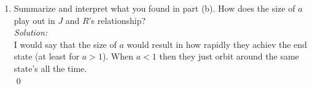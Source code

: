 \documentclass[10pt]{amsart}
\theoremstyle{nonumberplain}
\begin{document}
\begin{enumerate}[label={\bf {\arabic*}:}]
\begin{enumerate}
\begin{enumerate}
\item Verify what you found in part (i) with a plot of the phase portrait (using pplane).
You may choose a particular value of $a$ for plotting.
Interpret the long-time behavior of the system in terms of $R$ and $J$’s relationship. \\
\textit{Solution:} \\
In the scenario where $a > 1$ then the couple will attract one another feeling greater and greater affection until they reach a maximum and shoot off to infinity away from one another and then they will not like one another ever again.
Interestingly enough in the $a < 1$ case they will always orbit around affection for each other but will never settle in to a single particular value of affection just oscillating or orbiting in a particular tier. \\
\qed \\

\end{enumerate}

\item Summarize and interpret what you found in part (b).
How does the size of $a$ play out in $J$ and $R$’s relationship? \\
\textit{Solution:} \\
I would say that the size of $a$ would result in how rapidly they achiev the end state (at least for $a > 1$).
When $a < 1$ then they just orbit around the same state's all the time. \\
\qed \\

\end{enumerate}

\end{enumerate}
\end{document}
